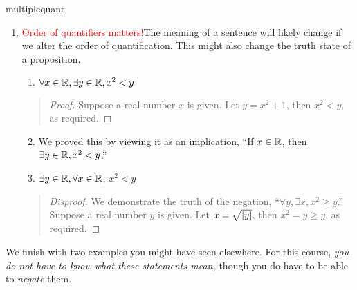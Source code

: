 \begin{examples}{}{multiplequant}
\begin{enumerate}
		
	  \item\label{ex:multiplequant2} \textcolor{red}{Order of quantifiers matters!}\lstsp The meaning of a sentence will likely change if we alter the order of quantification. This might also change the truth state of a proposition.
	  \begin{enumerate}
	  	\item $\forall x\in\mathbb{R},\exists y\in\mathbb{R},x^2<y$
		\end{enumerate}
		\begin{quote}
			\begin{proof}
				Suppose a real number $x$ is given. Let $y=x^2+1$, then $x^2<y$, as required.
			\end{proof}
		\end{quote}
	  \begin{enumerate}\setcounter{enumii}{1}
	    \item[]We proved this by viewing it as an implication, ``If $x\in\mathbb{R}$, then $\exists y\in\mathbb{R},x^2<y$.''
	  	\item $\exists y\in\mathbb{R},\forall x\in\mathbb{R}$, $x^2<y$
		\end{enumerate}
		\begin{quote}
			\begin{proof}[Disproof]
				We demonstrate the truth of the negation, ``$\forall y,\exists x,x^2\ge y$.''\smallbreak
				Suppose a real number $y$ is given. Let $x=\sqrt{\left| y\right|}$, then $x^2=y\ge y$, as required.
			\end{proof}
		\end{quote} 
	\end{enumerate}
\end{examples}



\goodbreak



We finish with two examples you might have seen elsewhere. For this course, \emph{you do not have to know what these statements mean,} though you do have to be able to \emph{negate} them.  

